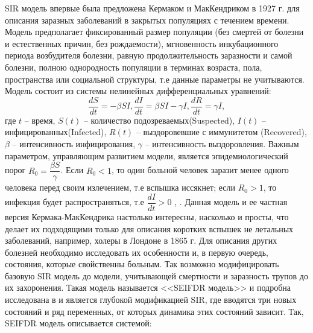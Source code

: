 SIR модель впервые была предложена Кермаком и МакКендриком в 1927 г. для описания заразных заболеваний в закрытых популяциях с течением времени. Модель предполагает фиксированный  размер популяции (без смертей от болезни и естественных причин, без рождаемости), мгновенность инкубационного периода возбудителя болезни, равную продолжительность заразности и самой болезни, полною однородность популяции в терминах возраста, пола, пространства или социальной структуры, т.е данные параметры не учитываются. Модель состоит из системы нелинейных дифференциальных уравнений: \\
\begin{equation} \label{SIR_model:1}
	\dfrac{dS}{dt} =  -\beta SI , 
	\dfrac{dI}{dt} = \beta SI - \gamma I ,
	\dfrac{dR}{dt} = \gamma I , 	
\end{equation}
где $t$ -- время, $S(t)$ -- количество подозреваемых(Suspected), $I(t)$ -- инфицированных(Infected), $R(t)$ -- выздоровевшие с иммунитетом (Recovered), $\beta$ -- интенсивность инфицирования, $ \gamma $ -- интенсивность выздоровления. Важным параметром, управляющим развитием модели, является эпидемиологический порог $R_0 = \dfrac{\beta S}{\gamma} $. Если $R_0 < 1$, то один больной человек заразит  менее одного человека перед своим излечением, т.е вспышка иссякнет; если $R_0 > 1$, то инфекция будет распространяться, т.е $\dfrac{dI}{dt} > 0$  %
\cite{Wolfram_MW:SIR} \cite{Anderson_May:1979}, \cite{Kermack_McKendrick:1927}.
Данная модель и ее частная версия Кермака-МакКендрика настолько интересны, насколько и просты, что делает их подходящими только для описания  коротких вспышек не летальных заболеваний, например, холеры в Лондоне в 1865 г. Для описания других болезней необходимо исследовать их особенности и, в первую очередь, состояния, которые свойственны больным. Так возможно  модифицировать базовую SIR модель до модели, учитывающей смертности и заразность трупов до их захоронения. Такая модель называется <<SEIFDR модель>> и подробна исследована  в %
\cite{Bykova:2015} и является глубокой модификацией SIR, где вводятся три новых состояний и ряд переменных, от которых динамика этих состояний зависит. Так, SEIFDR модель описывается системой:
